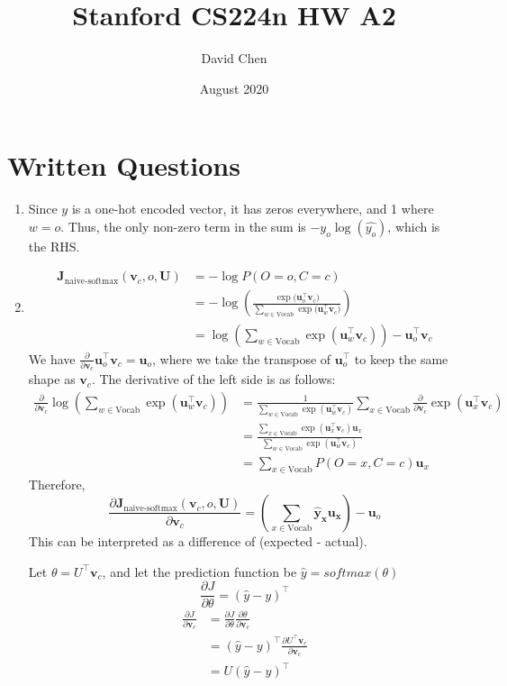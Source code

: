 \documentclass{article}
\title{Stanford CS224n HW A2}
\author{David Chen}
\date{August 2020}
\begin{document}
\maketitle

\section*{Written Questions}
\begin{enumerate}[label=(\alph*)]
    \item Since $y$ is a one-hot encoded vector, it has zeros everywhere, and 1 where $w = o$. Thus, the only non-zero term in the sum is $-y_o\log(\hat{y_o})$, which is the RHS.
    \item 
    \begin{align*}
    \boldsymbol{J}_{\text{naive-softmax}}(\mathbf{v}_c, o, \mathbf{U}) &= -\log P(O = o, C = c) \\ 
    &= -\log(\frac{\exp{(\mathbf{u}_o^\top \mathbf{v}_c})}{\sum_{w\in \text{Vocab}} \exp{(\mathbf{u}_w^\top \mathbf{v}_c})}) \\
    &= \log(\sum_{w\in \text{Vocab}} \exp(\mathbf{u}_w^\top \mathbf{v}_c)) - \mathbf{u}_o^\top \mathbf{v}_c
    \end{align*}
    We have $\frac{\partial}{\partial \mathbf{v}_c} \mathbf{u}_o^\top \mathbf{v}_c = \mathbf{u}_o$, where we take the transpose of $\mathbf{u}_o^\top$ to keep the same shape as $\mathbf{v}_c$. The derivative of the left side is as follows:
    \begin{align*}
        \frac{\partial}{\partial \mathbf{v}_c} \log(\sum_{w \in \text{Vocab}} \exp(\mathbf{u}_w^\top \mathbf{v}_c))
        &= \frac{1}{\sum_{w \in \text{Vocab}} \exp(\mathbf{u}_w^\top \mathbf{v}_c)} \sum_{x \in \text{Vocab}} \frac{\partial}{\partial \mathbf{v}_c} \exp(\mathbf{u}_x^\top \mathbf{v}_c) \\ &= \frac{\sum_{x \in \text{Vocab}} \exp(\mathbf{u}_x^\top \mathbf{v}_c) \mathbf{u}_x}{\sum_{w \in \text{Vocab}} \exp(\mathbf{u}_w^\top \mathbf{v}_c)} \\
        &= \sum_{x \in \text{Vocab}} P(O = x, C = c) \mathbf{u}_x
    \end{align*}
    Therefore,
    \[
    \frac{\partial \boldsymbol{J}_{\text{naive-softmax}} (\mathbf{v}_c, o, \mathbf{U})}{\partial \mathbf{v}_c}
    = (\sum_{x \in \text{Vocab}} \mathbf{\hat{y}_x\mathbf{u}_x}) - \mathbf{u}_o
    \]
    This can be interpreted as a difference of (expected - actual).
    
    
    Let $\theta = U^\top \mathbf{v}_c$, and let the prediction function be $\hat{y} = softmax(\theta)$
    \[
    \frac{\partial J}{\partial \theta} = (\hat{y} - y)^\top
    \]
    \begin{align*}
        \frac{\partial J}{\partial \mathbf{v}_c} &= \frac{\partial J}{\partial \theta}\frac{\partial \theta}{\partial \mathbf{v}_c}
        \\ &= (\hat{y} - y)^\top \frac{\partial U^\top \mathbf{v}_c}{\partial \mathbf{v}_c}
        \\ &= U(\hat{y} - y)^\top
    \end{align*}
    

\end{enumerate}
\end{document}
